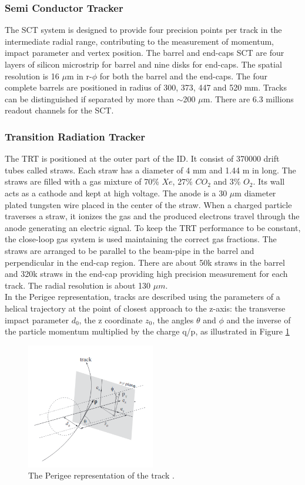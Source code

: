\subsubsection{Semi Conductor Tracker}
\label{chap2:ATLAS:ITK:SCT}
The SCT system is designed to provide four precision points per track in the intermediate radial range, contributing to the measurement of momentum, impact parameter and vertex position. The barrel and end-caps SCT are four layers of silicon microstrip for barrel and nine disks for end-caps. The spatial resolution is 16 $\mu$m in r-$\phi$ for both the barrel and the end-caps. The four complete barrels are positioned in radius of 300, 373, 447 and 520 mm. Tracks can be distinguished if separated by more than $\sim$200 $\mu$m. There are 6.3 millions readout channels for the SCT.
\subsubsection{Transition Radiation Tracker}
The TRT is positioned at the outer part of the ID. It consist of 370000 drift tubes called straws. Each straw has a diameter of 4 mm and 1.44 m in long. The straws are filled with a gas mixture of 70\% $Xe$, 27\% $CO_2$ and 3\% $O_2$. Its wall acts as a cathode and kept at high voltage. The anode is a 30 $\mu$m diameter plated tungsten wire placed in the center of the straw. When a charged particle traverses a straw, it ionizes the gas and the produced electrons travel through the anode generating an electric signal. To keep the TRT performance to be constant, the close-loop gas system is used maintaining the correct gas fractions. The straws are arranged to be parallel to the beam-pipe in the barrel and perpendicular in the end-cap region. There are about 50k straws in the barrel and 320k straws in the end-cap providing high precision measurement for each track. The radial resolution is about 130 $\mu m$. \\
In the Perigee representation, tracks are described using the parameters of a helical trajectory at the point of closest approach to the z-axis: the transverse impact parameter $d_0$, the z coordinate $z_0$, the angles $\theta$ and $\phi$ and the inverse of the particle momentum multiplied by the charge q/p, as illustrated in Figure \ref{fig:chap2:ATLAS:ITK:Trk}
\begin{figure}[htbp]
    \centering
    \includegraphics[width=0.5\textwidth]{Ch2/Img/Track.png}
    \caption{The Perigee representation of the track \cite{Track_schema}.}
    \label{fig:chap2:ATLAS:ITK:Trk}
\end{figure}
